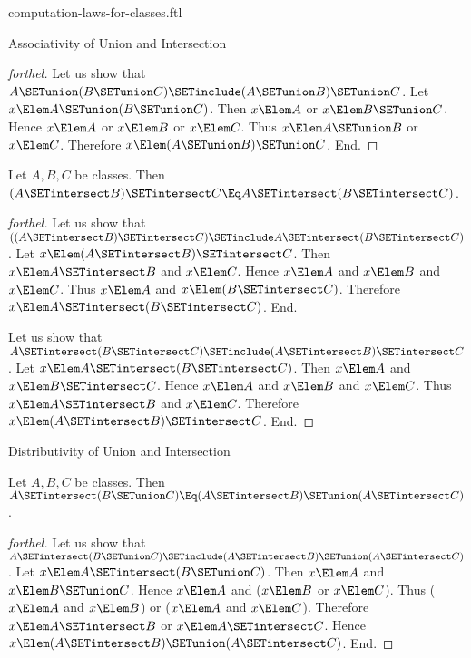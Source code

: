 \documentclass{stex}
\begin{document}
\begin{smodule}{computation-laws-for-classes.ftl}
\begin{sfragment}{Associativity of Union and Intersection}
\begin{proof}[forthel]
    Let us show that $A \SETunion (B \SETunion C) \SETinclude (A \SETunion B) \SETunion C$.
      Let $x \Elem A \SETunion (B \SETunion C)$.
      Then $x \Elem A$ or $x \Elem B \SETunion C$.
      Hence $x \Elem A$ or $x \Elem B$ or $x \Elem C$.
      Thus $x \Elem A \SETunion B$ or $x \Elem C$.
      Therefore $x \Elem (A \SETunion B) \SETunion C$.
    End.
  \end{proof}

  \begin{proposition}[forthel]
    Let $A, B, C$ be classes.
    Then $(A \SETintersect B) \SETintersect C \Eq A \SETintersect (B \SETintersect C)$.
  \end{proposition}
  \begin{proof}[forthel]
    Let us show that $((A \SETintersect B) \SETintersect C) \SETinclude A \SETintersect (B \SETintersect C)$. %
      Let $x \Elem (A \SETintersect B) \SETintersect C$.
      Then $x \Elem A \SETintersect B$ and $x \Elem C$.
      Hence $x \Elem A$ and $x \Elem B$ and $x \Elem C$.
      Thus $x \Elem A$ and $x \Elem (B \SETintersect C)$.
      Therefore$ x \Elem A \SETintersect (B \SETintersect C)$.
    End.

    Let us show that $A \SETintersect (B \SETintersect C) \SETinclude (A \SETintersect B) \SETintersect C$.
      Let $x \Elem A \SETintersect (B \SETintersect C)$.
      Then $x \Elem A$ and $x \Elem B \SETintersect C$.
      Hence $x \Elem A$ and $x \Elem B$ and $x \Elem C$.
      Thus $x \Elem A \SETintersect B$ and $x \Elem C$.
      Therefore $x \Elem (A \SETintersect B) \SETintersect C$.
    End.
  \end{proof}
\end{sfragment}

\begin{sfragment}{Distributivity of Union and Intersection}
  \begin{proposition}[forthel]
    Let $A, B, C$ be classes.
    Then $A \SETintersect (B \SETunion C) \Eq (A \SETintersect B) \SETunion (A \SETintersect C)$.
  \end{proposition}
  \begin{proof}[forthel]
    Let us show that $A \SETintersect (B \SETunion C) \SETinclude (A \SETintersect B) \SETunion (A \SETintersect C)$.
      Let $x \Elem A \SETintersect (B \SETunion C)$.
      Then $x \Elem A$ and $x \Elem B \SETunion C$.
      Hence $x \Elem A$ and ($x \Elem B$ or $x \Elem C$).
      Thus ($x \Elem A$ and $x \Elem B$) or ($x \Elem A$ and $x \Elem C$).
      Therefore $x \Elem A \SETintersect B$ or $x \Elem A \SETintersect C$.
      Hence $x \Elem (A \SETintersect B) \SETunion (A \SETintersect C)$.
    End.


\end{proof}
\end{sfragment}
\end{smodule}
\end{document}
